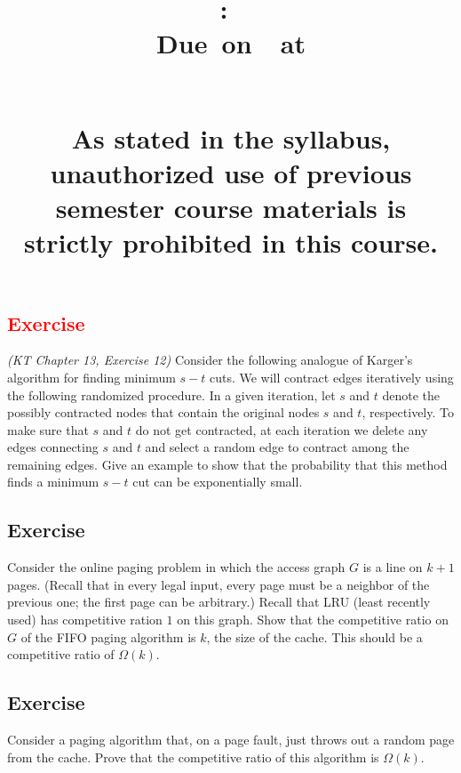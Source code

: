 \documentclass{article}
\title{
    \vspace{2in}
    \textbf{\hmwkClass:\ \hmwkTitle}\\
    \normalsize\vspace{0.1in}\small{Due\ on\ \hmwkDueDate\ at \hmwkDueTime}\\
    \vspace{0.1in}\large{\textit{\hmwkClassInstructor\ \hmwkSection}} \\
    \vspace{0.8in}
    \begin{minipage}[t]{0.4\columnwidth}
        {\footnotesize\textbf{As stated in the syllabus, unauthorized use of previous semester course materials is strictly prohibited in this course.
        }}
    \vspace{0.5in}
    \end{minipage}
    \vspace{0.8in}
    \author{\textbf{\hmwkAuthorName}}
    \date{}
}
\newcounter{counter}
\newcommand{\Exercise}{Exercise \stepcounter{counter}\thecounter}
\begin{document}
\maketitle
\pagebreak



\subsection*{\textcolor{red}{\Exercise}}
  \textit{(KT Chapter 13, Exercise 12)}  Consider the following analogue of Karger's algorithm for finding minimum $s-t$ cuts.  We will contract edges iteratively using the following randomized procedure.  In a given iteration, let $s$ and $t$ denote the possibly contracted nodes that contain the original nodes $s$ and $t$, respectively.  To make sure that $s$ and $t$ do not get contracted, at each iteration we delete any edges connecting $s$ and $t$ and select a random edge to contract among the remaining edges.  Give an example to show that the probability that this method finds a minimum $s-t$ cut can be exponentially small.

\subsection*{\Exercise}
  Consider the online paging problem in which the access graph $G$ is a line on $k+1$ pages. (Recall that in every legal input, every page must be a neighbor of the previous one; the first page can be arbitrary.) Recall that LRU (least recently used) has competitive ration $1$ on this graph. Show that the competitive ratio on $G$ of the FIFO paging algorithm is $k$, the size of the cache. This should be a competitive ratio of $\Omega(k)$.

\subsection*{\Exercise}
  Consider a paging algorithm that, on a page fault, just throws out a random page from the cache. Prove that the competitive ratio of this algorithm is $\Omega(k)$.
\end{document}
